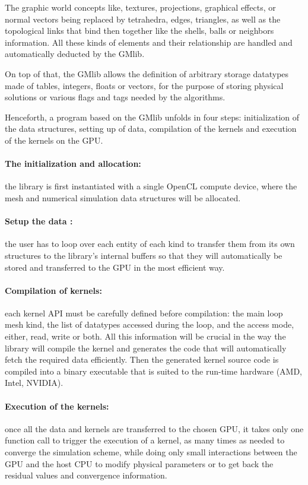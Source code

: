 \documentclass[a4paper,12pt]{article}
\begin{document}
The graphic world concepts like, textures, projections, graphical effects, or normal vectors being replaced by tetrahedra, edges, triangles, as well as the topological links that bind then together like the shells, balls or neighbors information. All these kinds of elements and their relationship are handled and automatically deducted by the GMlib.

On top of that, the GMlib allows the definition of arbitrary storage datatypes made of tables, integers, floats or vectors, for the purpose of storing physical solutions or various flags and tags needed by the algorithms.

Henceforth, a program based on the GMlib unfolds in four steps: initialization of the data structures, setting up of data, compilation of the kernels and execution of the kernels on the GPU.

\clearpage
\paragraph{The initialization and allocation:} the library is first instantiated with a single OpenCL compute device, where the mesh and numerical simulation data structures will be allocated.

\paragraph{Setup the data :} the user has to loop over each entity of each kind to transfer them from its own structures to the library's internal buffers so that they will automatically be stored and transferred to the GPU in the most efficient way.

\paragraph{Compilation of kernels:} each kernel API must be carefully defined before compilation: the main loop mesh kind, the list of datatypes accessed during the loop, and the access mode, either, read, write or both. All this information will be crucial in the way the library will compile the kernel and generates the code that will automatically fetch the required data efficiently. Then the generated kernel source code is compiled into a binary executable that is suited to the run-time hardware (AMD, Intel, NVIDIA).

\paragraph{Execution of the kernels:} once all the data and kernels are transferred to the chosen GPU, it takes only one function call to trigger the execution of a kernel, as many times as needed to converge the simulation scheme, while doing only small interactions between the GPU and the host CPU to modify physical parameters or to get back the residual values and convergence information.
\end{document}
